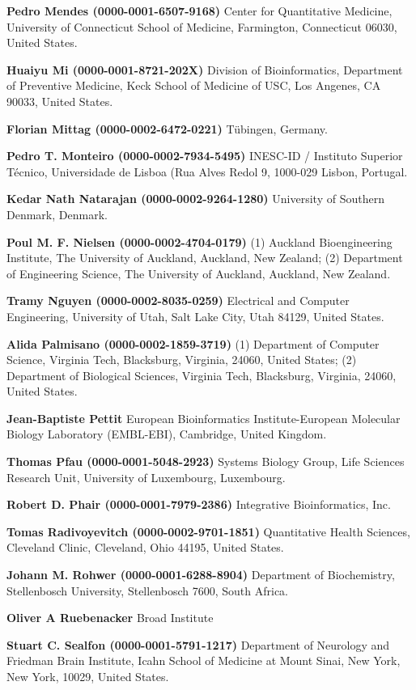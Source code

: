 \documentclass{sbml-paper}
\begin{document}
\textbf{Pedro Mendes (0000-0001-6507-9168)} Center for Quantitative Medicine, University of Connecticut School of Medicine, Farmington, Connecticut 06030, United States.

\textbf{Huaiyu Mi (0000-0001-8721-202X)} Division of Bioinformatics, Department of Preventive Medicine, Keck School of Medicine of USC, Los Angenes, CA 90033, United States.

\textbf{Florian Mittag (0000-0002-6472-0221)} Tübingen, Germany.

\textbf{Pedro T. Monteiro (0000-0002-7934-5495)} INESC-ID / Instituto Superior Técnico, Universidade de Lisboa (Rua Alves Redol 9, 1000-029 Lisbon, Portugal.

\textbf{Kedar Nath Natarajan (0000-0002-9264-1280)} University of Southern Denmark, Denmark.

\textbf{Poul M. F. Nielsen (0000-0002-4704-0179)} (1) Auckland Bioengineering Institute, The University of Auckland, Auckland, New Zealand; (2) Department of Engineering Science, The University of Auckland, Auckland, New Zealand.

\textbf{Tramy Nguyen (0000-0002-8035-0259)} Electrical and Computer Engineering, University of Utah, Salt Lake City, Utah 84129, United States.

\textbf{Alida Palmisano (0000-0002-1859-3719)} (1) Department of Computer Science, Virginia Tech, Blacksburg, Virginia, 24060,  United States; (2) Department of Biological Sciences, Virginia Tech, Blacksburg, Virginia, 24060, United States.

\textbf{Jean-Baptiste Pettit} European Bioinformatics Institute-European Molecular Biology Laboratory (EMBL-EBI), Cambridge, United Kingdom.

\textbf{Thomas Pfau (0000-0001-5048-2923)} Systems Biology Group, Life Sciences Research Unit, University of Luxembourg, Luxembourg.

\textbf{Robert D. Phair (0000-0001-7979-2386)} Integrative Bioinformatics, Inc.

\textbf{Tomas Radivoyevitch (0000-0002-9701-1851)} Quantitative Health Sciences, Cleveland Clinic, Cleveland, Ohio 44195, United States.

\textbf{Johann M. Rohwer (0000-0001-6288-8904)} Department of Biochemistry, Stellenbosch University, Stellenbosch 7600, South Africa.

\textbf{Oliver A Ruebenacker} Broad Institute

\textbf{Stuart C. Sealfon (0000-0001-5791-1217)} Department of Neurology and Friedman Brain Institute, Icahn School of Medicine at Mount Sinai, New York, New York, 10029, United States.
\end{document}
